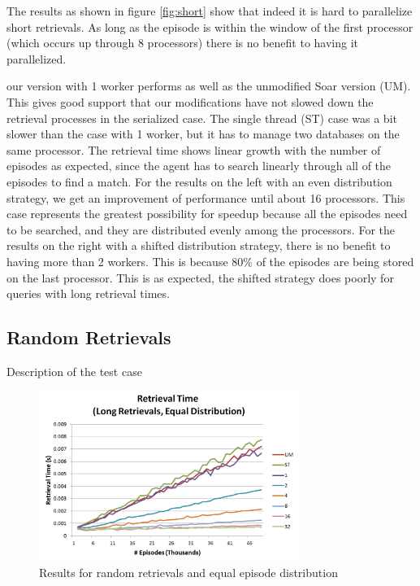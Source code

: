 \documentclass[11pt]{article} %
\begin{document}
The results as shown in figure \ref{fig:short} show that indeed it is hard to parallelize short retrievals. As long as the episode is within the window 
of the first processor (which occurs up through 8 processors) there is no benefit to having it parallelized. 

our version with 1 worker performs as well as the unmodified Soar version (UM). 
This gives good support that our modifications have not slowed down the retrieval processes in the serialized case. 
The single thread (ST) case was a bit slower than the case with 1 worker, but it has to manage two databases on the same processor. 
The retrieval time shows linear growth with the number of episodes 
as expected, since the agent has to search linearly through all of the episodes to find a match. 
For the results on the left with an even distribution strategy, we get an improvement of performance until about 16 processors. 
This case represents the greatest possibility for speedup because all the episodes need to be searched, and they are distributed evenly 
among the processors. For the results on the right with a shifted distribution strategy, there is no benefit to having more than 2 workers.
This is because $80\%$ of the episodes are being stored on the last processor. This is as expected, the shifted strategy does poorly for 
queries with long retrieval times. 

\subsection{Random Retrievals}
Description of the test case
\begin{figure}[h]
\caption{Results for random retrievals and equal episode distribution}
\centering
\includegraphics[width=0.75\textwidth]{images/ret_worst_eq}
\end{figure}
\end{document}
